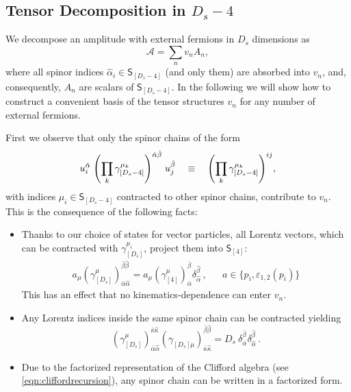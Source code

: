 \subsection{Tensor Decomposition in $D_s-4$}
\label{sec:HelAmplHV}

We decompose an amplitude with external fermions in $D_s$ dimensions as
\begin{equation} \label{eq:tensorDecomposition}
  \mathcal{A} = \sum_n v_n A_n,
\end{equation}
where all spinor indices $\hat{\alpha}_i \in \mathsf{S}_{[D_s-4]}$ (and only them) are absorbed into $v_n$,
and, consequently, $A_n$ are scalars of $\mathsf{S}_{[D_s-4]}$.
In the following we will show how to construct a convenient basis of the tensor structures $v_n$ 
for any number of external fermions.

First we observe that only the spinor chains of the form
\begin{equation} \label{eq:generic_dsm_4_schain}
  u^{\hat{\alpha}}_i \; \qty( \prod_k \gamma^{\mu_k}_{[D_s -4 ]} )^{\hat{\alpha}\hat{\beta}} \; u^{\hat{\beta}}_j \quad\equiv\quad 
  \qty( \prod_k \gamma^{\mu_k}_{[D_s -4 ]} )^{i j},
\end{equation}
with indices $\mu_i \in \mathsf{S}_{[D_s -4]}$ contracted to other spinor chains, contribute to $v_n$.
This is the consequence of the following facts:
\begin{itemize}
  \item Thanks to our choice of states for vector particles, all Lorentz vectors, which can be contracted with $\gamma^{\mu_i}_{[D_s]}$,
    project them into $\mathsf{S}_{[4]}$:
    \begin{align} \label{eq:trivialTens1}
      a_{\mu}
      \left( \gamma_{[D_s]}^\mu \right)_{\bar{\alpha}\hat{\alpha}}^{\bar{\beta}\hat{\beta}} =
      a_{\mu}\left(\gamma_{[4]}^\mu \right)_{\bar{\alpha}}^{\bar{\beta}} \delta_{\hat{\alpha}}^{\hat{\beta}}\,,
      &&
      a \in \{p_i,\varepsilon_{1,2}(p_i)\}
    \end{align}
    This has an effect that no kinematics-dependence can enter $v_n$.
  \item Any Lorentz indices inside the same spinor chain can be contracted yielding  
    \begin{equation} \label{eq:trivialTens2}
      \left(\gamma_{[D_s]}^\mu\right)_{\bar{\alpha}\hat{\alpha}}^{\bar{\kappa}\hat{\kappa}}
      \left(\gamma_{[D_s]\mu}^{\phantom{\mu}}\right)_{\bar{\kappa}\hat{\kappa}}^{\bar{\beta}\hat{\beta}}
      =D_s~\delta_{\bar{\alpha}}^{\bar{\beta}}\delta_{\hat{\alpha}}^{\hat{\beta}}\,.
    \end{equation} 
  \item Due to the factorized representation of the Clifford algebra (see \cref{eqn:cliffordrecursion}), any spinor chain can be written in a factorized form.
\end{itemize}
